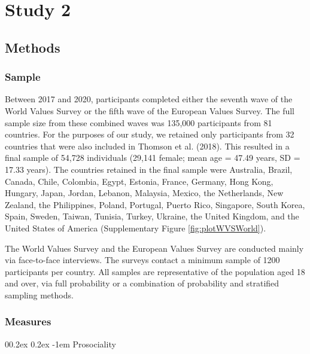 \documentclass[
  man,floatsintext]{apa6}
\makeatletter
\let\oldparagraph\paragraph
\renewcommand{\paragraph}[1]{\oldparagraph{#1}\mbox{}}
\renewcommand{\paragraph}{\@startsection{paragraph}{4}{\parindent}%
  {0\baselineskip \@plus 0.2ex \@minus 0.2ex}%
  {-1em}%
  {\normalfont\normalsize\bfseries\itshape\typesectitle}}
\makeatother
\begin{document}
\hypertarget{study-2}{%
\section{Study 2}\label{study-2}}

\hypertarget{methods-1}{%
\subsection{Methods}\label{methods-1}}

\hypertarget{sample-1}{%
\subsubsection{Sample}\label{sample-1}}

Between 2017 and 2020, participants completed either the seventh wave of the World Values Survey or the fifth wave of the European Values Survey. The full sample size from these combined waves was 135,000 participants from 81 countries. For the purposes of our study, we retained only participants from 32 countries that were also included in Thomson et al. (2018). This resulted in a final sample of 54,728 individuals (29,141 female; mean age = 47.49 years, SD = 17.33 years). The countries retained in the final sample were Australia, Brazil, Canada, Chile, Colombia, Egypt, Estonia, France, Germany, Hong Kong, Hungary, Japan, Jordan, Lebanon, Malaysia, Mexico, the Netherlands, New Zealand, the Philippines, Poland, Portugal, Puerto Rico, Singapore, South Korea, Spain, Sweden, Taiwan, Tunisia, Turkey, Ukraine, the United Kingdom, and the United States of America (Supplementary Figure \ref{fig:plotWVSWorld}).

The World Values Survey and the European Values Survey are conducted mainly via face-to-face interviews. The surveys contact a minimum sample of 1200 participants per country. All samples are representative of the population aged 18 and over, via full probability or a combination of probability and stratified sampling methods.

\hypertarget{measures-1}{%
\subsubsection{Measures}\label{measures-1}}

\hypertarget{prosociality-1}{%
\paragraph{Prosociality}\label{prosociality-1}}
\end{document}
